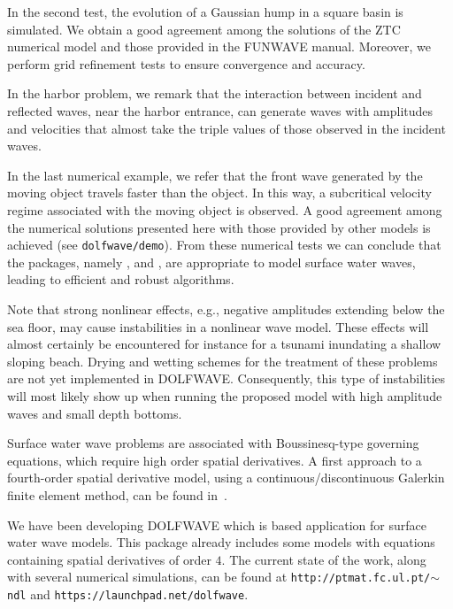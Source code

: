   In the second test, the evolution of a Gaussian hump in a
square basin is simulated.  We obtain a good agreement among
the solutions of the ZTC numerical model and those provided
in the FUNWAVE manual.  Moreover, we perform grid refinement
tests to ensure convergence and accuracy.

In the harbor problem, we
remark that the interaction between incident and reflected
waves, near the harbor entrance, can generate waves with
amplitudes and velocities that almost take the triple values
of those observed in the incident waves.

In the last
numerical example, we refer that the front wave generated by the
moving object travels faster than the object.  In this way,
a subcritical velocity regime associated with the moving
object is observed.  A good agreement among the numerical
solutions presented here with those provided by other models
is achieved (see {\tt dolfwave/demo}).  From these numerical
tests we can conclude that the \fenics packages,
namely \dolfin, \ufl and \ffc, are appropriate to model
surface water waves, leading to efficient and robust
algorithms.

Note that  strong nonlinear
effects, e.g., negative amplitudes extending below the sea floor,
may cause instabilities in a nonlinear wave model.
These effects will almost
certainly be encountered for instance for a tsunami
inundating a shallow sloping beach.
Drying and wetting schemes for the treatment of these problems are
not yet implemented in DOLFWAVE.
Consequently, this type of instabilities will most likely
show up when running the proposed model with  high amplitude
waves  and small depth bottoms.

Surface water wave problems are associated with
Boussinesq-type governing equations, which require high
order spatial derivatives. A first approach to a
fourth-order spatial derivative model, using a
continuous/discontinuous Galerkin finite element method, can
be found in~\citet{LopesPereiraTrabucho}.

We have been developing DOLFWAVE which is \fenics based application
for surface water wave models. This package already includes some
models with equations containing spatial derivatives of order $4$.
The current state of the work, along with several nume\-ri\-cal
simulations, can be found at {\tt http://ptmat.fc.ul.pt/$\sim$ndl} and
{\tt https://launchpad.net/dolfwave}.
